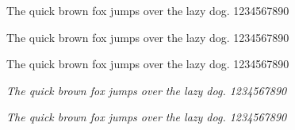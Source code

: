 \documentclass{article}
\newcommand{\pangram}[1][\rmfamily]{{#1 The quick brown fox jumps over the lazy dog. 1234567890}\par}
\begin{document}
\large
\pangram
\pangram[\sffamily]
\pangram[\ttfamily]
\pangram[\itshape]
\pangram[\slshape]
\end{document}
